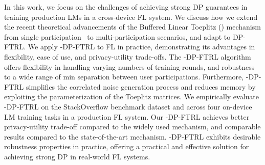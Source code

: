 In this work, we focus on the challenges of achieving strong DP guarantees in training production LMs in a cross-device FL system. We discuss how we extend the recent theoretical advancements of the Buffered Linear Toeplitz (\blt) mechanism from single participation~\citep{mcmahan2024efficient} to multi-participation scenarios, and adapt \blt to DP-FTRL. We apply \blt-DP-FTRL to FL in practice, demonstrating its advantages in flexibility, ease of use, and privacy-utility trade-offs. The \blt-DP-FTRL algorithm offers flexibility in handling varying numbers of training rounds, and robustness to a wide range of min separation between user participations. Furthermore, \blt-DP-FTRL simplifies the correlated noise generation process and reduces memory by exploiting the parameterization of the Toeplitz matrices. 
We empirically evaluate \blt-DP-FTRL on the StackOverflow benchmark dataset and across four on-device LM training tasks in a production FL system. Our \blt-DP-FTRL achieves better privacy-utility trade-off compared to the widely used \treeagg mechanism, and comparable results compared to the state-of-the-art \bandmf mechanism. 
\blt-DP-FTRL exhibits desirable robustness properties in practice, offering a practical and effective solution for achieving strong DP in real-world FL systems.
